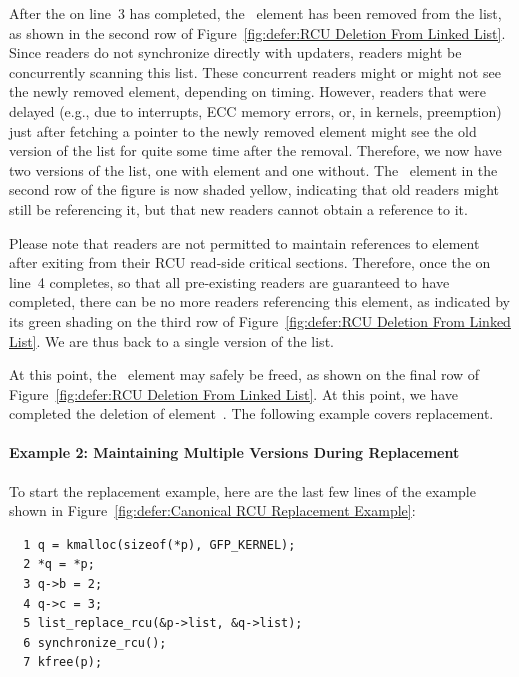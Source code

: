 After the  on
line~3 has completed, the ~element
has been removed from the list, as shown in the second row of
Figure~\ref{fig:defer:RCU Deletion From Linked List}.
Since readers do not synchronize directly with updaters,
readers might be concurrently scanning this list.
These concurrent readers might or might not see the newly removed element,
depending on timing.
However, readers that were delayed (e.g., due to interrupts, ECC memory
errors, or, in  kernels, preemption)
just after fetching a pointer to the newly removed element might
see the old version of the list for quite some time after the
removal.
Therefore, we now have two versions of the list, one with element
 and one without.
The ~element in the second row of the figure is now
shaded yellow, indicating
that old readers might still be referencing it, but that new
readers cannot obtain a reference to it.

Please note that readers are not permitted to maintain references to
element~ after exiting from their RCU read-side
critical sections.
Therefore,
once the  on
line~4 completes, so that all pre-existing readers are
guaranteed to have completed,
there can be no more readers referencing this
element, as indicated by its green shading on the third row of
Figure~\ref{fig:defer:RCU Deletion From Linked List}.
We are thus back to a single version of the list.

At this point, the ~element may safely be
freed, as shown on the final row of
Figure~\ref{fig:defer:RCU Deletion From Linked List}.
At this point, we have completed the deletion of
element~.
The following example covers replacement.

\paragraph{Example 2: Maintaining Multiple Versions During Replacement}
\label{sec:defer:Example 2: Maintaining Multiple Versions During Replacement}

To start the replacement example,
here are the last few lines of the
example shown in
Figure~\ref{fig:defer:Canonical RCU Replacement Example}:

\vspace{5pt}
\begin{minipage}[t]{\columnwidth}
\scriptsize
\begin{verbatim}
  1 q = kmalloc(sizeof(*p), GFP_KERNEL);
  2 *q = *p;
  3 q->b = 2;
  4 q->c = 3;
  5 list_replace_rcu(&p->list, &q->list);
  6 synchronize_rcu();
  7 kfree(p);
\end{verbatim}
\end{minipage}
\vspace{5pt}

